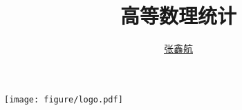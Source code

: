 \documentclass[cn,blue,14pt,screen]{elegantnote}
\title{高等数理统计}
\author{\href{mailto:zhangxinhang19@foxmail.com}{张鑫航}}
\institute{国防科技大学}
\date{\zhtoday}
\begin{document}
\maketitle
\centerline{
  \texttt{[image: figure/logo.pdf]}
}
\newpage






\end{document}
